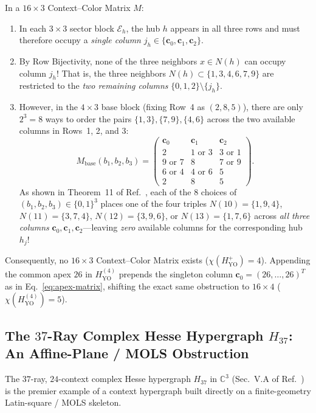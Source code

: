 \documentclass[aps,pra,reprint,superscriptaddress,longbibliography,nofootinbib,floatfix,10pt]{revtex4-2}
\theoremstyle{definition}\newtheorem{definition}[theorem]{Definition}
\theoremstyle{remark}\newtheorem{remark}[theorem]{Remark}
\newcommand{\C}{\mathbb C}\newcommand{\R}{\mathbb R}\newcommand{\Q}{\mathbb Q}
\newcommand{\YO}{\mathrm{YO}}\newcommand{\ip}[2]{\langle #1,#2\rangle}
\begin{document}
In a $16\times 3$ Context--Color Matrix $M$:
\begin{enumerate}
\item In each $3\times 3$ sector block $\mathcal{E}_h$, the hub $h$ appears in all three rows and must therefore occupy a \emph{single column} $j_h\in\{\mathbf{c}_0,\mathbf{c}_1,\mathbf{c}_2\}$.
\item By Row Bijectivity, none of the three neighbors $x\in N(h)$ can occupy column $j_h$! That is, the three neighbors $N(h)\subset\{1,3,4,6,7,9\}$ are restricted to the \emph{two remaining columns} $\{0,1,2\}\setminus\{j_h\}$.
\item However, in the $4\times 3$ base block (fixing Row~4 as $(2,8,5)$), there are only $2^3=8$ ways to order the pairs $\{1,3\},\{7,9\},\{4,6\}$ across the two available columns in Rows~1, 2, and 3:
\begin{equation}\label{eq:YO-base-matrix}
M_{\mathrm{base}}(b_1,b_2,b_3)=\begin{pmatrix}
\mathbf{c}_0 & \mathbf{c}_1 & \mathbf{c}_2\\\hline
2 & 1\text{ or }3 & 3\text{ or }1\\
9\text{ or }7 & 8 & 7\text{ or }9\\
6\text{ or }4 & 4\text{ or }6 & 5\\
2 & 8 & 5
\end{pmatrix}.
\end{equation}
As shown in Theorem~11 of Ref.~\cite{svozil-2025-color}, each of the $8$ choices of $(b_1,b_2,b_3)\in\{0,1\}^3$ places one of the four triples $N(10)=\{1,9,4\}$, $N(11)=\{3,7,4\}$, $N(12)=\{3,9,6\}$, or $N(13)=\{1,7,6\}$ across \emph{all three columns} $\mathbf{c}_0,\mathbf{c}_1,\mathbf{c}_2$—leaving \emph{zero} available columns for the corresponding hub $h_j$!
\end{enumerate}
Consequently, no $16\times 3$ Context--Color Matrix exists ($\chi(H_{\YO}^+)=4$). Appending the common apex $26$ in $H_{\YO}^{(4)}$ prepends the singleton column $\mathbf{c}_0=(26,\ldots,26)^T$ as in Eq.~\eqref{eq:apex-matrix}, shifting the exact same obstruction to $16\times 4$ ($\chi(H_{\YO}^{(4)})=5$).

\subsection{The \texorpdfstring{$37$}{37}-Ray Complex Hesse Hypergraph \texorpdfstring{$H_{37}$}{H37}: An Affine-Plane / MOLS Obstruction}\label{sec:H37}

The $37$-ray, $24$-context complex Hesse hypergraph $H_{37}$ in $\C^3$ (Sec.~V.A of Ref.~\cite{svozil-2025-color}) is the premier example of a context hypergraph built directly on a finite-geometry Latin-square / MOLS skeleton.
\end{document}
